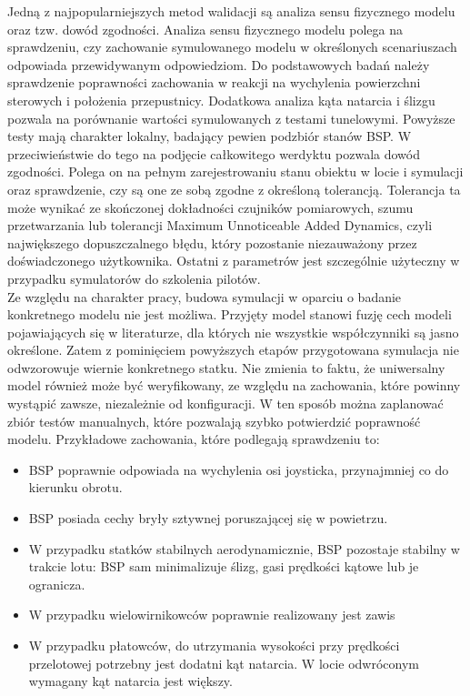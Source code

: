 Jedną z najpopularniejszych metod walidacji są analiza sensu fizycznego modelu oraz tzw. dowód zgodności. Analiza sensu fizycznego modelu polega na sprawdzeniu, czy zachowanie symulowanego modelu w określonych scenariuszach odpowiada przewidywanym odpowiedziom. Do podstawowych badań należy sprawdzenie poprawności zachowania w reakcji na wychylenia powierzchni sterowych i położenia przepustnicy. Dodatkowa analiza kąta natarcia i ślizgu pozwala na porównanie wartości symulowanych z testami tunelowymi. Powyższe testy mają charakter lokalny, badający pewien podzbiór stanów BSP. W przeciwieństwie do tego na podjęcie całkowitego werdyktu pozwala dowód zgodności. Polega on na pełnym zarejestrowaniu stanu obiektu w locie i symulacji oraz sprawdzenie, czy są one ze sobą zgodne z określoną tolerancją. Tolerancja ta może wynikać ze skończonej dokładności czujników pomiarowych, szumu przetwarzania lub tolerancji Maximum Unnoticeable Added Dynamics, czyli największego dopuszczalnego błędu, który pozostanie niezauważony przez doświadczonego użytkownika. Ostatni z parametrów jest szczególnie użyteczny w przypadku symulatorów do szkolenia pilotów.\\

Ze względu na charakter pracy, budowa symulacji w oparciu o badanie konkretnego modelu nie jest możliwa. Przyjęty model stanowi fuzję cech modeli pojawiających się w literaturze, dla których nie wszystkie współczynniki są jasno określone. Zatem z pominięciem powyższych etapów przygotowana symulacja nie odwzorowuje wiernie konkretnego statku. Nie zmienia to faktu, że uniwersalny model również może być weryfikowany, ze względu na zachowania, które powinny wystąpić zawsze, niezależnie od konfiguracji. W ten sposób można zaplanować zbiór testów manualnych, które pozwalają szybko potwierdzić poprawność modelu. Przykładowe zachowania, które podlegają sprawdzeniu to:
\begin{itemize}[noitemsep]
\item BSP poprawnie odpowiada na wychylenia osi joysticka, przynajmniej co do kierunku obrotu.
\item BSP posiada cechy bryły sztywnej poruszającej się w powietrzu.
\item W przypadku statków stabilnych aerodynamicznie, BSP pozostaje stabilny w trakcie lotu: BSP sam minimalizuje ślizg, gasi prędkości kątowe lub je ogranicza.
\item W przypadku wielowirnikowców poprawnie realizowany jest zawis
\item W przypadku płatowców, do utrzymania wysokości przy prędkości przelotowej potrzebny jest dodatni kąt natarcia. W locie odwróconym wymagany kąt natarcia jest większy.
\end{itemize}